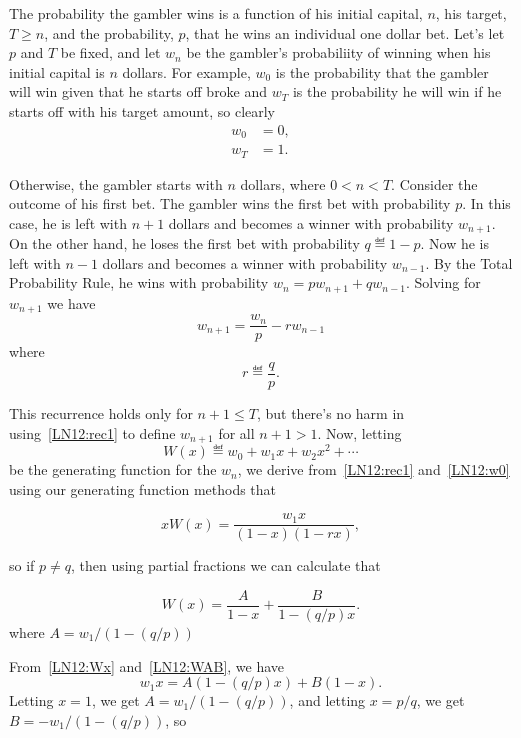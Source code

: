 The probability the gambler wins is a function of his initial capital,
$n$, his target, $T \geq n$, and the probability, $p$, that he wins an
individual one dollar bet.  Let's let $p$ and $T$ be fixed, and let $w_n$
be the gambler's probabiliity of winning when his initial capital is $n$
dollars.  For example, $w_0$ is the probability that the gambler will win
given that he starts off broke and $w_T$ is the probability he will win if
he starts off with his target amount, so clearly
\begin{align}
w_0 & = 0,\label{LN12:w0}\\
w_T & = 1. \label{LN12:wT}
\end{align}

Otherwise, the gambler starts with $n$ dollars, where $0 < n < T$.
Consider the outcome of his first bet.  The gambler wins the first bet
with probability $p$.  In this case, he is left with $n+1$ dollars and
becomes a winner with probability $w_{n+1}$.  On the other hand, he loses
the first bet with probability $q \eqdef 1-p$.  Now he is left with $n-1$
dollars and becomes a winner with probability $w_{n-1}$.  By the Total
Probability Rule, he wins with probability $w_n = p w_{n+1} + q w_{n-1}$.
Solving for $w_{n+1}$ we have
\begin{equation}\label{LN12:rec1}
w_{n+1} = \frac{w_n}{p} -r w_{n-1}
\end{equation}
where
\[
r \eqdef \frac{q}{p}.
\]

This recurrence holds only for $n+1 \leq T$, but there's no harm in
using~\eqref{LN12:rec1} to define $w_{n+1}$ for all $n+1 >1$.  Now, letting
\[
W(x) \eqdef w_0 + w_1x + w_2x^2 + \cdots
\]
be the generating function for the $w_n$, we derive from~\eqref{LN12:rec1}
and~\eqref{LN12:w0} using our generating function methods that
\iffalse
\[
\frac{xW(x)}{p} - \frac{q}{p}x^2W(x) = W(x) - w_1x,
\]
so
\fi
\begin{equation}\label{LN12:Wx}
xW(x) = \frac{w_1x}{(1-x)(1-rx)},
\end{equation}

so if $p \neq q$, then using partial fractions we can calculate that

\begin{editingnotes}
\begin{equation}\label{LN12:WAB}
W(x)= \frac{A}{1-x} + \frac{B}{1-(q/p)x}.
\end{equation}
where $A=w_1/(1-(q/p))$

From~\eqref{LN12:Wx} and~\eqref{LN12:WAB}, we have
\[
w_1x = A(1-(q/p)x) + B(1-x).
\]
Letting $x=1$, we get $A=w_1/(1-(q/p))$, and letting $x=p/q$, we get
$B=-w_1/(1-(q/p))$, so

\end{editingnotes}

